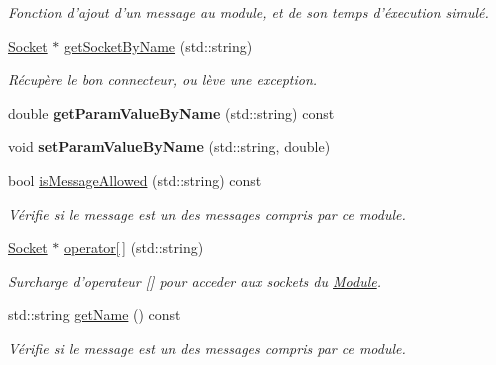 \begin{DoxyCompactItemize}
\begin{DoxyCompactList}\small\item\em Fonction d'ajout d'un message au module, et de son temps d'éxecution simulé. \end{DoxyCompactList}\item 
\hyperlink{classSocket}{Socket} $\ast$ \hyperlink{classModule_aed844ffed911793d3895c5a2bc4f9d43}{get\-Socket\-By\-Name} (std\-::string)
\begin{DoxyCompactList}\small\item\em Récupère le bon connecteur, ou lève une exception. \end{DoxyCompactList}\item 
\hypertarget{classModule_a095495cee28654973ddc13a836e37141}{double {\bfseries get\-Param\-Value\-By\-Name} (std\-::string) const }\label{classModule_a095495cee28654973ddc13a836e37141}

\item 
\hypertarget{classModule_ace0e4299e1a6f9b46aa9fd316483895d}{void {\bfseries set\-Param\-Value\-By\-Name} (std\-::string, double)}\label{classModule_ace0e4299e1a6f9b46aa9fd316483895d}

\item 
\hypertarget{classModule_a3919f2388fc70b4686a9ad63af9f06aa}{bool \hyperlink{classModule_a3919f2388fc70b4686a9ad63af9f06aa}{is\-Message\-Allowed} (std\-::string) const }\label{classModule_a3919f2388fc70b4686a9ad63af9f06aa}

\begin{DoxyCompactList}\small\item\em Vérifie si le message est un des messages compris par ce module. \end{DoxyCompactList}\item 
\hypertarget{classModule_a2752ad2f437a772d02b474383b5a214f}{\hyperlink{classSocket}{Socket} $\ast$ \hyperlink{classModule_a2752ad2f437a772d02b474383b5a214f}{operator\mbox{[}$\,$\mbox{]}} (std\-::string)}\label{classModule_a2752ad2f437a772d02b474383b5a214f}

\begin{DoxyCompactList}\small\item\em Surcharge d'operateur \mbox{[}\mbox{]} pour acceder aux sockets du \hyperlink{classModule}{Module}. \end{DoxyCompactList}\item 
\hypertarget{classModule_a3c1ecab9c7fa778807e253c26aa54310}{std\-::string \hyperlink{classModule_a3c1ecab9c7fa778807e253c26aa54310}{get\-Name} () const }\label{classModule_a3c1ecab9c7fa778807e253c26aa54310}

\begin{DoxyCompactList}\small\item\em Vérifie si le message est un des messages compris par ce module. \end{DoxyCompactList}\end{DoxyCompactItemize}
